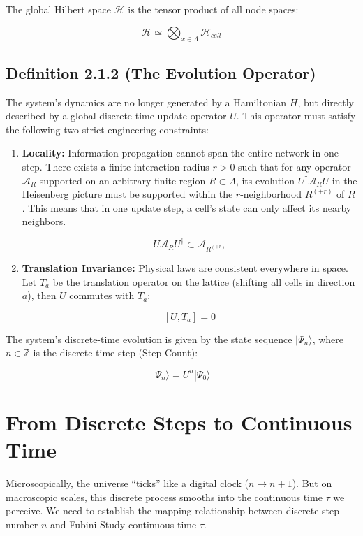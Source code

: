 \documentclass[11pt,a4paper,twoside]{book}
\begin{document}
The global Hilbert space \textbf{$\mathcal{H}$} is the tensor product of all node spaces:

$$\mathcal{H} \simeq \bigotimes_{x \in \Lambda} \mathcal{H}_{cell}$$

\subsection{Definition 2.1.2 (The Evolution Operator)}

The system's dynamics are no longer generated by a Hamiltonian \textbf{$H$}, but directly described by a global discrete-time update operator \textbf{$U$}. This operator must satisfy the following two strict engineering constraints:

\begin{enumerate}
\item \textbf{Locality:} Information propagation cannot span the entire network in one step. There exists a finite interaction radius \textbf{$r > 0$} such that for any operator \textbf{$\mathcal{A}_R$} supported on an arbitrary finite region \textbf{$R \subset \Lambda$}, its evolution \textbf{$U^\dagger \mathcal{A}_R U$} in the Heisenberg picture must be supported within the \textbf{$r$}-neighborhood \textbf{$R^{(+r)}$} of \textbf{$R$}. This means that in one update step, a cell's state can only affect its nearby neighbors.

   $$U \mathcal{A}_R U^\dagger \subset \mathcal{A}_{R^{(+r)}}$$

\item \textbf{Translation Invariance:} Physical laws are consistent everywhere in space. Let \textbf{$T_a$} be the translation operator on the lattice (shifting all cells in direction \textbf{$a$}), then \textbf{$U$} commutes with \textbf{$T_a$}:

   $$[U, T_a] = 0$$
\end{enumerate}

The system's discrete-time evolution is given by the state sequence \textbf{$|\Psi_n\rangle$}, where \textbf{$n \in \mathbb{Z}$} is the discrete time step (Step Count):

$$|\Psi_n\rangle = U^n |\Psi_0\rangle$$

\section{From Discrete Steps to Continuous Time}

Microscopically, the universe ``ticks'' like a digital clock (\textbf{$n \to n+1$}). But on macroscopic scales, this discrete process smooths into the continuous time \textbf{$\tau$} we perceive. We need to establish the mapping relationship between discrete step number \textbf{$n$} and Fubini-Study continuous time \textbf{$\tau$}.
\end{document}

